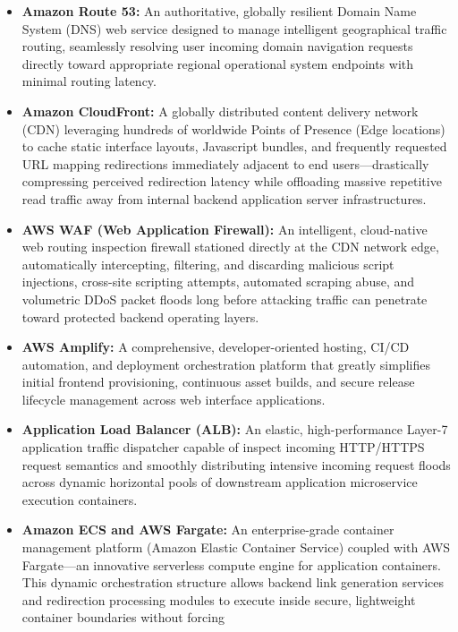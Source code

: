 \begin{itemize}
\tightlist
\item
  \textbf{Amazon Route 53:} An authoritative, globally resilient Domain
  Name System (DNS) web service designed to manage intelligent
  geographical traffic routing, seamlessly resolving user incoming
  domain navigation requests directly toward appropriate regional
  operational system endpoints with minimal routing latency.
\item
  \textbf{Amazon CloudFront:} A globally distributed content delivery
  network (CDN) leveraging hundreds of worldwide Points of Presence
  (Edge locations) to cache static interface layouts, Javascript
  bundles, and frequently requested URL mapping redirections immediately
  adjacent to end users---drastically compressing perceived redirection
  latency while offloading massive repetitive read traffic away from
  internal backend application server infrastructures.
\item
  \textbf{AWS WAF (Web Application Firewall):} An intelligent,
  cloud-native web routing inspection firewall stationed directly at the
  CDN network edge, automatically intercepting, filtering, and
  discarding malicious script injections, cross-site scripting attempts,
  automated scraping abuse, and volumetric DDoS packet floods long
  before attacking traffic can penetrate toward protected backend
  operating layers.
\item
  \textbf{AWS Amplify:} A comprehensive, developer-oriented hosting,
  CI/CD automation, and deployment orchestration platform that greatly
  simplifies initial frontend provisioning, continuous asset builds, and
  secure release lifecycle management across web interface applications.
\item
  \textbf{Application Load Balancer (ALB):} An elastic, high-performance
  Layer-7 application traffic dispatcher capable of inspect incoming
  HTTP/HTTPS request semantics and smoothly distributing intensive
  incoming request floods across dynamic horizontal pools of downstream
  application microservice execution containers.
\item
  \textbf{Amazon ECS and AWS Fargate:} An enterprise-grade container
  management platform (Amazon Elastic Container Service) coupled with
  AWS Fargate---an innovative serverless compute engine for application
  containers. This dynamic orchestration structure allows backend link
  generation services and redirection processing modules to execute
  inside secure, lightweight container boundaries without forcing

\end{itemize}
